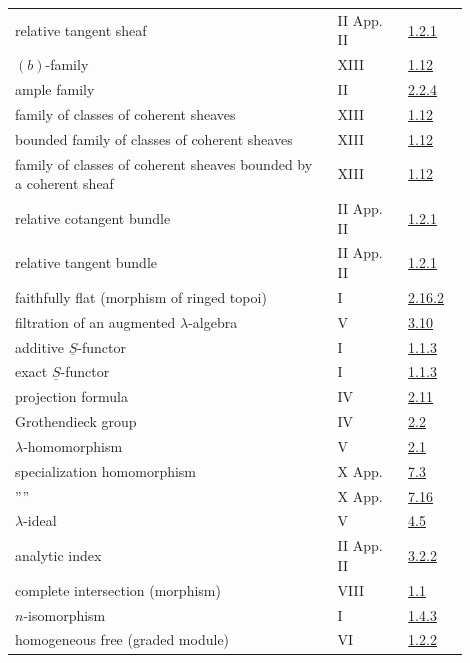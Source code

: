 \begin{longtable}{@{}>{\raggedright\arraybackslash}p{0.64\linewidth}>{\raggedright\arraybackslash}p{0.14\linewidth}>{\raggedright\arraybackslash}p{0.12\linewidth}@{}}
relative tangent sheaf & II App. II & \hyperlink{sga6.e02.para.1-2-1}{1.2.1}\\
\((b)\)-family & XIII & \hyperlink{sga6.e13.para.1-12}{1.12}\\
ample family & II & \hyperlink{sga6.e02.def.2-2-4}{2.2.4}\\
family of classes of coherent sheaves & XIII & \hyperlink{sga6.e13.para.1-12}{1.12}\\
bounded family of classes of coherent sheaves & XIII & \hyperlink{sga6.e13.para.1-12}{1.12}\\
family of classes of coherent sheaves bounded by a coherent sheaf & XIII & \hyperlink{sga6.e13.para.1-12}{1.12}\\
relative cotangent bundle & II App. II & \hyperlink{sga6.e02.para.1-2-1}{1.2.1}\\
relative tangent bundle & II App. II & \hyperlink{sga6.e02.para.1-2-1}{1.2.1}\\
faithfully flat (morphism of ringed topoi) & I & \hyperlink{sga6.e01.exercise.2-16-2}{2.16.2}\\
filtration of an augmented \(\lambda\)-algebra & V & \hyperlink{sga6.e05.para.3-10}{3.10}\\
additive \(\underline S\)-functor & I & \hyperlink{sga6.e01.para.1-1-3}{1.1.3}\\
exact \(\underline S\)-functor & I & \hyperlink{sga6.e01.para.1-1-3}{1.1.3}\\
projection formula & IV & \hyperlink{sga6.e04.para.2-11}{2.11}\\
Grothendieck group & IV & \hyperlink{sga6.e04.def.2-2}{2.2}\\
\(\lambda\)-homomorphism & V & \hyperlink{sga6.e05.def.2-1}{2.1}\\
specialization homomorphism & X App. & \hyperlink{sga6.e10.prop.7-3}{7.3}\\
\qquad''\hspace{8em}'' & X App. & \hyperlink{sga6.e10.sec.7.16}{7.16}\\
\(\lambda\)-ideal & V & \hyperlink{sga6.e05.def.4-5}{4.5}\\
analytic index & II App. II & \hyperlink{sga6.e02.para.3-2-2}{3.2.2}\\
complete intersection (morphism) & VIII & \hyperlink{sga6.e08.def.1-1}{1.1}\\
\(n\)-isomorphism & I & \hyperlink{sga6.e01.def.1-4-3}{1.4.3}\\
homogeneous free (graded module) & VI & \hyperlink{sga6.e06.eq.1-2-2}{1.2.2}\\

\end{longtable}
